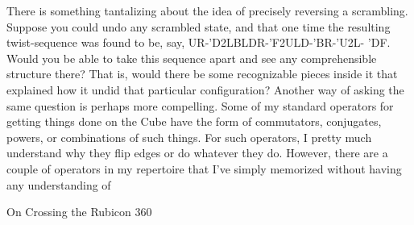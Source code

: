         There is something tantalizing about the idea of precisely reversing a
scrambling. Suppose you could undo any scrambled state, and that one time the
resulting twist-sequence was found to be, say, UR-'D2LBLDR-'F2ULD-'BR-'U2L-
'DF. Would you be able to take this sequence apart and see any comprehensible
structure there? That is, would there be some recognizable pieces inside it that
explained how it undid that particular configuration?
        Another way of asking the same question is perhaps more compelling.
Some of my standard operators for getting things done on the Cube have the form
of commutators, conjugates, powers, or combinations of such things. For such
operators, I pretty much understand why they flip edges or do whatever they do.
However, there are a couple of operators in my repertoire that I've simply
memorized without having any understanding of




On Crossing the Rubicon                                                                360

